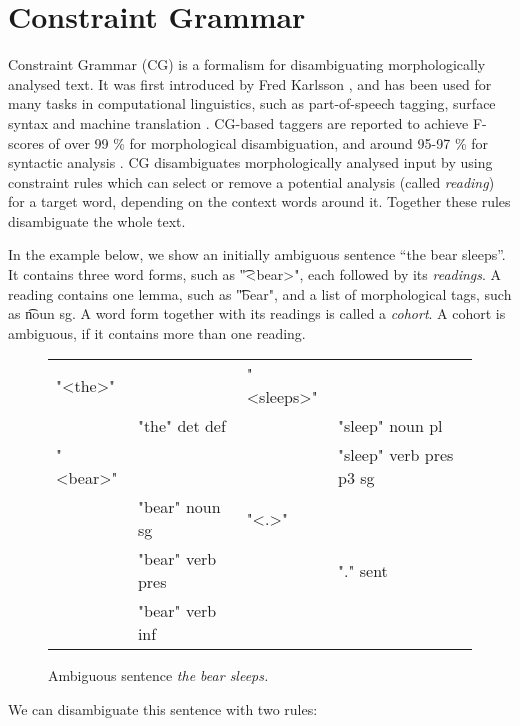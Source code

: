 
\section{Constraint Grammar}
\label{sec:cg-intro}

Constraint Grammar (CG) is a formalism for 
disambiguating morphologically analysed text. 
It was first introduced by Fred Karlsson  
\cite{karlsson1990cgp,karlsson1995constraint}, and has been used for many tasks in
computational linguistics, such as part-of-speech tagging, surface syntax and
machine translation \cite{bick2011}.
CG-based taggers are reported to achieve F-scores of over 99 \% for morphological disambiguation, 
and around 95-97 \% for syntactic analysis \cite{bick2000palavras,bick2003hybridCG_PSG,bick2006spanish}.
CG disambiguates morphologically analysed input by using
constraint rules which can select or remove a potential analysis (called \emph{reading})
for a target word, depending on the context words around it. 
Together these rules disambiguate the whole text.


In the example below, we show an initially ambiguous sentence ``the bear
sleeps''. 
It contains three word forms, such as \t{"<bear>"}, each followed by its \emph{readings}.
A reading contains one lemma, such as \t{"bear"}, and a list of morphological tags, such as \t{noun sg}.
A word form together with its readings is called a \emph{cohort}. A cohort is ambiguous, if it contains more than one reading.

\begin{figure}[h]
\centering
\ttfamily
\begin{tabular}{p{0.6cm} l  p{0.6cm} l}
"<the>"  &                & "<sleeps>"        \\
    & "the" det def       &     & "sleep" noun pl \\
"<bear>" &                &     & "sleep" verb pres p3 sg \\
    & "bear" noun sg      & "<.>"                   \\
    & "bear" verb pres    &     & "." sent          \\
    & "bear" verb inf \\
\end{tabular}
\label{fig:theBearSleeps}
\caption{Ambiguous sentence {\em the bear sleeps.}}
\end{figure}


\noindent We can disambiguate this sentence with two rules:

